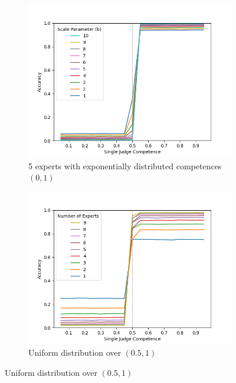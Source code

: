 \documentclass[letterpaper]{article} %
\begin{document}
\begin{figure}[t]
\begin{subfigure}{0.3\textwidth}
\end{subfigure}
\hfill
\begin{subfigure}{0.3\textwidth}
 \includegraphics[width=\textwidth]{./Figures/Experiment1_Exponential/Lineplot_5experts_Experiment1_exponential[0,1]_experts_1judge_100000iter.png}
 \caption{5 experts with exponentially distributed competences $(0,1)$}
\label{fig:E1_exponential_01}
\end{subfigure}
\hfill
 \begin{subfigure}{0.3\textwidth}
 \includegraphics[width=\textwidth]{./Figures/Experiment1_Uniform/Experiment1_uniform[05,1]_compare_numexperts.png}
 \caption{Uniform distribution over $(0.5,1)$}
\label{fig:E1_uniform_05,1}
\end{subfigure}

\end{figure}
\end{document}
